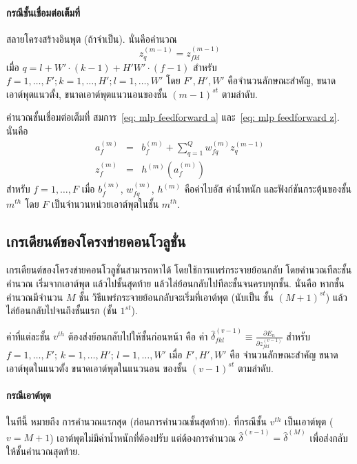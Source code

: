 \paragraph{กรณีชั้นเชื่อมต่อเต็มที่}
สลายโครงสร้างอินพุต (ถ้าจำเป็น).
นั่นคือคำนวณ
\[
z_q^{(m-1)} = z_{fkl}^{(m-1)}
\nonumber
\]
เมื่อ 
$q = l + W' \cdot (k - 1) + H' W' \cdot (f - 1)$
สำหรับ $f = 1, \ldots, F'; k = 1, \ldots, H'; l = 1, \ldots, W'$
โดย $F', H', W'$ คือจำนวนลักษณะสำคัญ, ขนาดเอาต์พุตแนวตั้ง, ขนาดเอาต์พุตแนวนอนของชั้น $(m-1)^{st}$ ตามลำดับ.

คำนวณชั้นเชื่อมต่อเต็มที่ สมการ~\ref{eq: mlp feedforward a} %
และ~\ref{eq: mlp feedforward z}. %
นั่นคือ
\begin{eqnarray}
a_f^{(m)} &=& b_f^{(m)} + \sum_{q=1}^Q w_{fq}^{(m)} z_q^{(m-1)}
\nonumber \\
z_f^{(m)} &=& h^{(m)}(a_f^{(m)})
\nonumber  
\end{eqnarray}
สำหรับ $f = 1, \ldots, F$ 
เมื่อ $b_f^{(m)}$, $w_{fq}^{(m)}$, $h^{(m)}$ คือค่าไบอัส ค่าน้ำหนัก และฟังก์ชันกระตุ้นของชั้น $m^{th}$
โดย $F$ เป็นจำนวนหน่วยเอาต์พุตในชั้น $m^{th}$.

\subsection{เกรเดียนต์ของโครงข่ายคอนโวลูชั่น} 
เกรเดียนต์ของโครงข่ายคอนโวลูชั่นสามารถหาได้
โดยใช้การแพร่กระจายย้อนกลับ โดยคำนวณทีละชั้นคำนวณ เริ่มจากเอาต์พุต แล้วไปชั้นสุดท้าย
แล้วไล่ย้อนกลับไปทีละชั้นจนครบทุกชั้น.
นั่นคือ หากชั้นคำนวณมีจำนวน $M$ ชั้น
วิธีแพร่กระจายย้อนกลับจะเริ่มที่เอาต์พุต (นับเป็น ชั้น $(M+1)^{st}$) แล้วไล่ย้อนกลับไปจนถึงชั้นแรก
(ชั้น $1^{st}$).

ค่าที่แต่ละชั้น $v^{th}$ ต้องส่งย้อนกลับไปให้ชั้นก่อนหน้า คือ ค่า $\hat{\delta}_{fkl}^{(v-1)} \equiv \frac{\partial E_n}{\partial z_{fkl}^{(v-1)}}$ 
สำหรับ $f = 1, \ldots, F'$; $k = 1, \ldots, H'$; 
$l = 1, \ldots, W'$
เมื่อ $F', H', W'$ คือ จำนวนลักษณะสำคัญ ขนาดเอาต์พุตในแนวตั้ง ขนาดเอาต์พุตในแนวนอน ของชั้น $(v-1)^{st}$ ตามลำดับ.

\paragraph{กรณีเอาต์พุต}
ในทีนี้ หมายถึง การคำนวณแรกสุด (ก่อนการคำนวณชั้นสุดท้าย).
ที่กรณีชั้น $v^{th}$ เป็นเอาต์พุต ($v = M+1$)
เอาต์พุตไม่มีค่าน้ำหนักที่ต้องปรับ แต่ต้องการคำนวณ $\hat{\delta}^{(v-1)} = \hat{\delta}^{(M)}$ เพื่อส่งกลับให้ชั้นคำนวณสุดท้าย.

